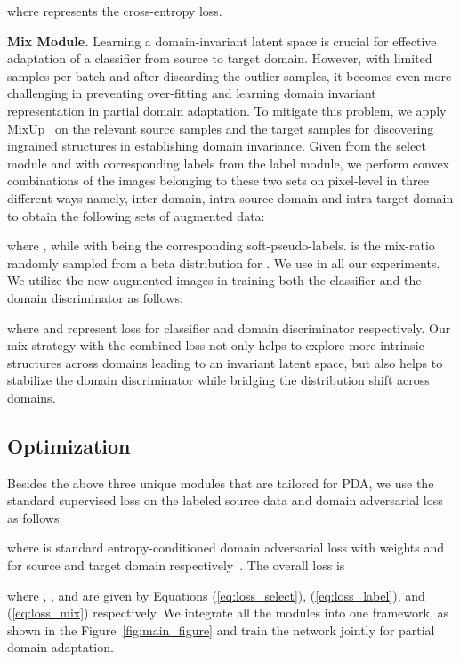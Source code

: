 \documentclass[10pt,twocolumn,letterpaper]{article}
\begin{document}
where  represents the cross-entropy loss.

\vspace{1mm}
\noindent\textbf{Mix Module.}
Learning a domain-invariant latent space is crucial for effective adaptation of a classifier from source to target domain. However, with limited samples per batch and after discarding the outlier samples, it becomes even more challenging in preventing over-fitting and learning domain invariant representation in partial domain adaptation. To mitigate this problem, we apply MixUp~\cite{zhang2017mixup} on the relevant source samples and the target samples for discovering ingrained structures in establishing domain invariance. Given  from the select module and  with corresponding labels  from the label module, we perform convex combinations of the images belonging to these two sets on pixel-level in three different ways namely, inter-domain, intra-source domain and intra-target domain to obtain the following sets of augmented data:

where , while  with   being the corresponding soft-pseudo-labels.  is the mix-ratio randomly sampled from a beta distribution  for . We use  in all our experiments. 
We utilize the new augmented images in training both the classifier  and the domain discriminator  as follows:

where  and  represent loss for classifier and domain discriminator respectively. Our mix strategy with the combined loss  not only helps to explore more intrinsic structures across domains leading to an invariant latent space, but also helps to stabilize the domain discriminator while bridging the distribution shift across domains.

\subsection{Optimization}
Besides the above three unique modules that are tailored for PDA, we use the standard supervised loss on the labeled source data and domain adversarial loss as follows:

where  is standard entropy-conditioned domain adversarial loss with weights   and  for source and target domain respectively~\cite{long2018conditional}. The overall loss  is

where , , and  are given by Equations (\ref{eq:loss_select}), (\ref{eq:loss_label}), and (\ref{eq:loss_mix}) respectively. We integrate all the modules into one framework, as shown in the Figure~\ref{fig:main_figure} and train the network jointly for partial domain adaptation.   
 
\end{document}
